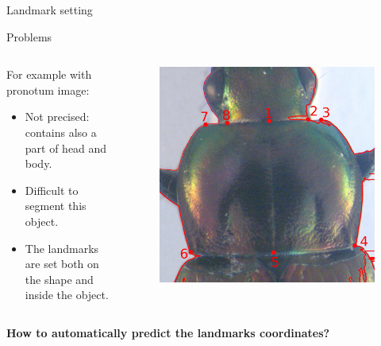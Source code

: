 \documentclass[10pt,svgnames]{beamer}
\begin{document}
\begin{frame}{Landmark setting}{}
	\begin{block}{Problems}
		\begin{columns}
			\begin{column}{0.65\textwidth}
				For example with pronotum image:
				\begin{itemize}
  					\item Not precised: contains also a part of head and body.
		  			\item Difficult to segment this object.
  					\item The landmarks are set both on the shape and inside the object.
  				\end{itemize}
			\end{column}
			\begin{column}{0.3\textwidth}
				\begin{figure}[htbp]
					\centering
					\includegraphics[scale=.040]{images/prono_003_lm2}
				\end{figure}
			\end{column}
		\end{columns}		
	\end{block}
	\pause
	\begin{center}	
		\textbf{How to {\color{red}automatically} predict the {\color{red}landmarks coordinates}?}	
	\end{center}
  	
  
	
\end{frame}
\end{document}
